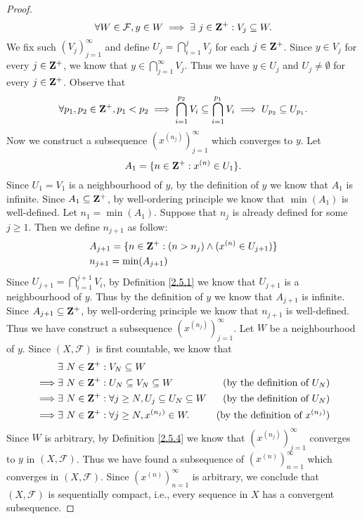 \begin{proof}
    \[
        \forall W \in \mathcal{F}, y \in W \implies \exists\ j \in \mathbf{Z}^+ : V_j \subseteq W.
    \]
    We fix such \((V_j)_{j = 1}^\infty\) and define \(U_j = \bigcap_{i = 1}^j V_j\) for each \(j \in \mathbf{Z}^+\).
    Since \(y \in V_j\) for every \(j \in \mathbf{Z}^+\), we know that \(y \in \bigcap_{j = 1}^\infty V_j\).
    Thus we have \(y \in U_j\) and \(U_j \neq \emptyset\) for every \(j \in \mathbf{Z}^+\).
    Observe that
    \[
        \forall p_1, p_2 \in \mathbf{Z}^+, p_1 < p_2 \implies \bigcap_{i = 1}^{p_2} V_i \subseteq \bigcap_{i = 1}^{p_1} V_i \implies U_{p_2} \subseteq U_{p_1}.
    \]
    Now we construct a subsequence \((x^{(n_j)})_{j = 1}^\infty\) which converges to \(y\).
    Let
    \[
        A_1 = \{n \in \mathbf{Z}^+ : x^{(n)} \in U_1\}.
    \]
    Since \(U_1 = V_1\) is a neighbourhood of \(y\), by the definition of \(y\) we know that \(A_1\) is infinite.
    Since \(A_1 \subseteq \mathbf{Z}^+\), by well-ordering principle we know that \(\min(A_1)\) is well-defined.
    Let \(n_1 = \min(A_1)\).
    Suppose that \(n_j\) is already defined for some \(j \geq 1\).
    Then we define \(n_{j + 1}\) as follow:
    \begin{align*}
         & A_{j + 1} = \{n \in \mathbf{Z}^+ : (n > n_j) \land (x^{(n)} \in U_{j + 1})\} \\
         & n_{j + 1} = \min(A_{j + 1})
    \end{align*}
    Since \(U_{j + 1} = \bigcap_{i = 1}^{j + 1} V_i\), by Definition \ref{2.5.1} we know that \(U_{j + 1}\) is a neighbourhood of \(y\).
    Thus by the definition of \(y\) we know that \(A_{j + 1}\) is infinite.
    Since \(A_{j + 1} \subseteq \mathbf{Z}^+\), by well-ordering principle we know that \(n_{j + 1}\) is well-defined.
    Thus we have construct a subsequence \((x^{(n_j)})_{j = 1}^\infty\).
    Let \(W\) be a neighbourhood of \(y\).
    Since \((X, \mathcal{F})\) is first countable, we know that
    \begin{align*}
                 & \exists\ N \in \mathbf{Z}^+ : V_N \subseteq W                                                                               \\
        \implies & \exists\ N \in \mathbf{Z}^+ : U_N \subseteq V_N \subseteq W                   & \text{(by the definition of \(U_N\))}       \\
        \implies & \exists\ N \in \mathbf{Z}^+ : \forall j \geq N, U_j \subseteq U_N \subseteq W & \text{(by the definition of \(U_N\))}       \\
        \implies & \exists\ N \in \mathbf{Z}^+ : \forall j \geq N, x^{(n_j)} \in W.              & \text{(by the definition of \(x^{(n_j)}\))}
    \end{align*}
    Since \(W\) is arbitrary, by Definition \ref{2.5.4} we know that \((x^{(n_j)})_{j = 1}^\infty\) converges to \(y\) in \((X, \mathcal{F})\).
    Thus we have found a subsequence of \((x^{(n)})_{n = 1}^\infty\) which converges in \((X, \mathcal{F})\).
    Since \((x^{(n)})_{n = 1}^\infty\) is arbitrary, we conclude that \((X, \mathcal{F})\) is sequentially compact, i.e., every sequence in \(X\) has a convergent subsequence.
\end{proof}

